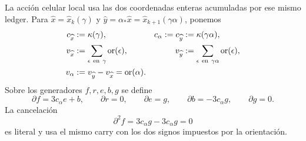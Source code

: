 La acción celular local usa las dos coordenadas enteras acumuladas por ese
mismo ledger. Para
\(\widehat x=\widehat x_k(\gamma)\) y
\(\widehat y=\alpha_*\widehat x=\widehat x_{k+1}(\gamma\alpha)\), ponemos
\begin{equation}
\label{eq:pdfv2-cor-c-v}
 \begin{aligned}
 c_{\widehat x}&:=\kappa(\gamma), &
 c_\alpha:=c_{\widehat y}&:=\kappa(\gamma\alpha),\\
 v_{\widehat x}&:=\sum_{\epsilon\ {\rm en}\ \gamma}
                  \operatorname{or}(\epsilon), &
 v_{\widehat y}&:=\sum_{\epsilon\ {\rm en}\ \gamma\alpha}
                  \operatorname{or}(\epsilon),\\
 v_\alpha&:=v_{\widehat y}-v_{\widehat x}
           =\operatorname{or}(\alpha).&&
 \end{aligned}
\end{equation}
Sobre los generadores \(f,r,e,b,g\) se define
\begin{equation}
\label{eq:pdfv2-cor-complejo-local}
 \partial f=3c_\alpha e+b,\qquad
 \partial r=0,\qquad
 \partial e=g,\qquad
 \partial b=-3c_\alpha g,\qquad
 \partial g=0.
\end{equation}
La cancelación
\begin{equation}
\label{eq:pdfv2-cor-dos-cero}
 \partial^2f=3c_\alpha g-3c_\alpha g=0
\end{equation}
es literal y usa el mismo carry con los dos signos impuestos por la
orientación.

